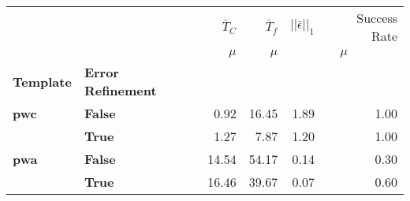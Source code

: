 \begin{tabular}{llrrrr}
    \toprule
                      &                           & $\bar{T}_C$ & $\bar{T}_f$ & $ ||\bar{\epsilon}||_1$   & Success Rate \\
                      &                           & $\mu$       & $\mu$       & \multicolumn{2}{c}{$\mu$}                \\
    \textbf{Template} & \textbf{Error Refinement} &             &             &                           &              \\
    \midrule
    \textbf{pwc}      & \textbf{False}            & 0.92        & 16.45       & 1.89                      & 1.00         \\
                      & \textbf{True }            & 1.27        & 7.87        & 1.20                      & 1.00         \\
    \midrule
    \textbf{pwa}      & \textbf{False}            & 14.54       & 54.17       & 0.14                      & 0.30         \\
                      & \textbf{True }            & 16.46       & 39.67       & 0.07                      & 0.60         \\
    \bottomrule
\end{tabular}
